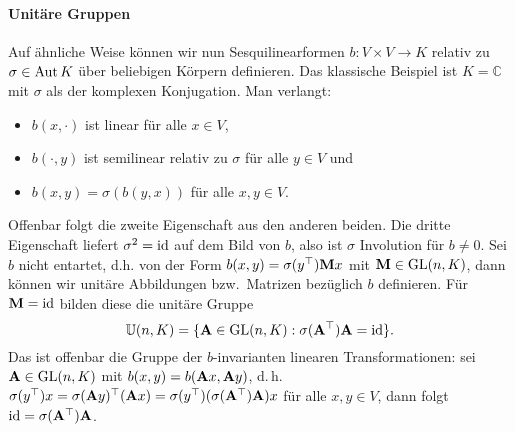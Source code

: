 \paragraph{Unitäre Gruppen} Auf ähnliche Weise können wir nun Sesquilinearformen $b: V \times V \to K$ relativ zu $\sigma \in \operatorname{Aut} K$ über beliebigen Körpern definieren. Das klassische Beispiel ist $K = \mathbb C$ mit $\sigma$ als der komplexen Konjugation. Man verlangt:
\begin{itemize}
\item $b(x, \cdot)$ ist linear für alle $x \in V$,
\item $b(\cdot, y)$ ist semilinear relativ zu $\sigma$ für alle $y \in V$ und
\item $b(x,y) = \sigma(b(y,x))$ für alle $x,y \in V$.
\end{itemize}
Offenbar folgt die zweite Eigenschaft aus den anderen beiden. Die dritte Eigenschaft liefert $\sigma^2 = \operatorname{id}$ auf dem Bild von $b$, also ist $\sigma$ Involution für $b \neq 0$. Sei $b$ nicht entartet, d.h. von der Form $b(x,y) = \sigma(y^\top) \mathbf{M} x$ mit $\mathbf{M} \in \mathrm{GL}(n,K)$, dann können wir unitäre Abbildungen bzw.~Matrizen bezüglich $b$ definieren. Für $\mathbf{M} = \operatorname{id}$ bilden diese die unitäre Gruppe
\begin{equation}
\mathbb U(n,K) = \{ \mathbf{A} \in \mathrm{GL}(n,K): \sigma(\mathbf{A}^\top) \mathbf{A} = \operatorname{id} \}.
\end{equation}
Das ist offenbar die Gruppe der $b$-invarianten linearen Transformationen: sei $\mathbf{A} \in \mathrm{GL}(n,K)$ mit $b(x,y) = b(\mathbf{A}x, \mathbf{A}y)$, d.\,h. $\sigma(y^\top) x = \sigma(\mathbf{A}y)^\top (\mathbf{A}x) = \sigma(y^\top) (\sigma(\mathbf{A}^\top) \mathbf{A}) x$ für alle $x, y \in V$, dann folgt $\operatorname{id} = \sigma(\mathbf{A}^\top) \mathbf{A}$.

